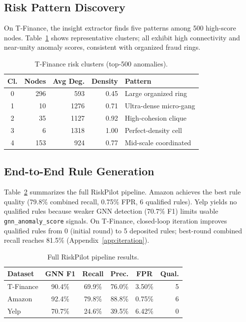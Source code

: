 \documentclass[sigconf,nonacm]{acmart}
\begin{document}
\subsection{Risk Pattern Discovery}
On T-Finance, the insight extractor finds five patterns among 500 high-score nodes.
Table~\ref{tab:clusters} shows representative clusters; all exhibit high connectivity and near-unity anomaly scores, consistent with organized fraud rings.

\begin{table}[t]
\caption{T-Finance risk clusters (top-500 anomalies).}
\label{tab:clusters}
\small
\begin{tabular}{crrrl}
\toprule
Cl. & Nodes & Avg Deg. & Density & Pattern \\
\midrule
0 & 296 & 593  & 0.45 & Large organized ring \\
1 &  10 & 1276 & 0.71 & Ultra-dense micro-gang \\
2 &  35 & 1127 & 0.92 & High-cohesion clique \\
3 &   6 & 1318 & 1.00 & Perfect-density cell \\
4 & 153 & 924  & 0.77 & Mid-scale coordinated \\
\bottomrule
\end{tabular}
\end{table}

\subsection{End-to-End Rule Generation}
Table~\ref{tab:pipeline} summarizes the full RiskPilot pipeline.
Amazon achieves the best rule quality (79.8\% combined recall, 0.75\% FPR, 6 qualified rules).
Yelp yields no qualified rules because weaker GNN detection (70.7\% F1) limits usable \texttt{gnn\_anomaly\_score} signals.
On T-Finance, closed-loop iteration improves qualified rules from 0 (initial round) to 5 deposited rules; best-round combined recall reaches 81.5\% (Appendix~\ref{app:iteration}).

\begin{table}[t]
\caption{Full RiskPilot pipeline results.}
\label{tab:pipeline}
\small
\begin{tabular}{lccccr}
\toprule
Dataset & GNN F1 & Recall & Prec. & FPR & Qual. \\
\midrule
T-Finance & 90.4\% & 69.9\% & 76.0\% & 3.50\% & 5 \\
Amazon    & 92.4\% & 79.8\% & 88.8\% & 0.75\% & 6 \\
Yelp      & 70.7\% & 24.6\% & 39.5\% & 6.42\% & 0 \\
\bottomrule
\end{tabular}
\end{table}
\end{document}
